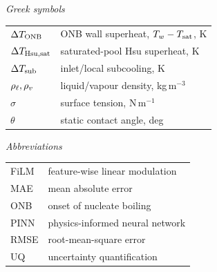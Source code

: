 \begin{minipage}[t]{0.48\textwidth}
\textit{Greek symbols}\\[2pt]
\begin{tabular}{@{}l l@{}}
$\Delta T_{\mathrm{ONB}}$    & ONB wall superheat, $T_w-T_{\mathrm{sat}}$, K \\
$\Delta T_{\mathrm{Hsu,sat}}$    & saturated-pool Hsu superheat, K \\
$\Delta T_{\mathrm{sub}}$    & inlet/local subcooling, K \\
$\rho_{\ell},\rho_{v}$ & liquid/vapour density, kg\,m$^{-3}$ \\
$\sigma$    & surface tension, N\,m$^{-1}$ \\
$\theta$    & static contact angle, deg \\
\end{tabular}

\vspace{8pt}
\textit{Abbreviations}\\[2pt]
\begin{tabular}{@{}l l@{}}
FiLM   & feature-wise linear modulation \\
MAE    & mean absolute error \\
ONB    & onset of nucleate boiling \\
PINN   & physics-informed neural network \\
RMSE   & root-mean-square error \\
UQ     & uncertainty quantification \\
\end{tabular}
\end{minipage}

\vspace{6pt}
